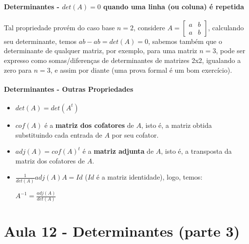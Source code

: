 \documentclass[12pt]{article}
\begin{document}
\newpage
\paragraph{Determinantes - $det(A) = 0$ quando uma linha (ou coluna) é repetida\\}
	Tal propriedade provém do caso base $n = 2$, considere $A = \begin{bmatrix} a & b \\ a & b \end{bmatrix}$, calculando seu determinante, temos $ab - ab = det(A) = 0$, sabemos também que o determinante de qualquer matriz, por exemplo, para uma matriz $n=3$, pode ser expresso como somas/diferenças de determinantes de matrizes 2x2, igualando a zero para $n=3$, e assim por diante (uma prova formal é um bom exercício).
	
\paragraph{Determinantes - Outras Propriedades}
	\begin{itemize}
		\item $det(A) =  det(A^t)$
		\item $cof(A)$ é a \textbf{matriz dos cofatores} de $A$, isto é, a matriz obtida substituindo cada entrada de $A$ por seu cofator.
		\item $adj(A) = cof(A)^t$ é a \textbf{matriz adjunta} de $A$, isto é, a transposta da matriz dos cofatores de $A$.
		\item $\frac{1}{det(A)} adj(A) A = Id$ ($Id$ é a matriz identidade), logo, temos:
		\begin{center}
			$A^{-1} = \frac{adj(A)}{det(A)}$
		\end{center}
	\end{itemize}
	
\newpage
\section*{Aula 12 - Determinantes (parte 3)}
\end{document}
